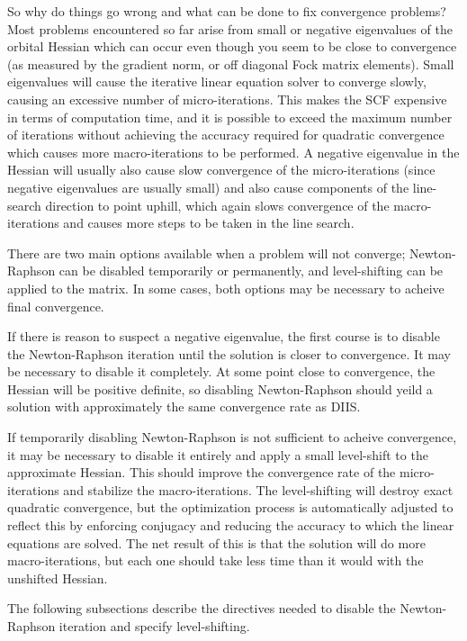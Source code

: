   So why do things go wrong and what can be done to fix convergence
problems?  Most problems encountered so far arise from small or
negative eigenvalues of the orbital Hessian which can occur even
though you seem to be close to convergence (as measured by the
gradient norm, or off diagonal Fock matrix elements).  Small
eigenvalues will cause the iterative linear equation solver to
converge slowly, causing an excessive number of micro-iterations.
This makes the SCF expensive in terms of computation time, and
it is possible to exceed the maximum
number of iterations without achieving the accuracy required for
quadratic convergence which causes more macro-iterations to be
performed.  A negative eigenvalue in the Hessian will usually also
cause slow convergence of the micro-iterations (since negative
eigenvalues are usually small) and also cause components of the
line-search direction to point uphill, which again slows convergence
of the macro-iterations and causes more steps to be taken in the line
search.

  There are two main options available when a problem will not converge;
Newton-Raphson can be disabled temporarily or permanently, and level-shifting 
can be applied to the matrix.  In some cases, both options may be 
necessary to acheive final convergence.

If there is reason to suspect a negative eigenvalue,
the first course is to disable the Newton-Raphson iteration until the
solution is closer to convergence.  It may be necessary to disable it
completely.  At some point close to convergence, the Hessian will be
positive definite, so disabling Newton-Raphson should yeild a solution with
approximately the same convergence rate as DIIS.

If temporarily disabling Newton-Raphson is not sufficient to acheive 
convergence, it may be necessary to disable it entirely and apply a 
small level-shift to the approximate Hessian.  
This should improve the convergence rate of the
micro-iterations and stabilize the macro-iterations.  The
level-shifting will destroy exact quadratic convergence, but the
optimization process is automatically adjusted to reflect this by
enforcing conjugacy and reducing the accuracy to which the linear
equations are solved.  The net result of this is that the solution will
do more macro-iterations, but each one should take less time than it would
with the unshifted Hessian.

The following subsections describe the directives needed to disable the
Newton-Raphson iteration and specify level-shifting.


